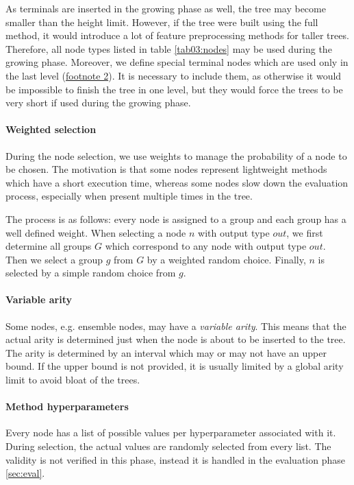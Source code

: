 As terminals are inserted in the growing phase as well, the tree may become
smaller than the height limit. However, if the tree were built using the full
method, it would introduce a lot of feature preprocessing methods for taller
trees. Therefore, all node types listed in table \ref{tab03:nodes} may be used
during the growing phase. Moreover, we define special terminal nodes which are
used only in the last level (\hyperref[tab03:nodes]{footnote 2}). It is
necessary to include them, as otherwise it would be impossible to finish the
tree in one level, but they would force the trees to be very short if used
during the growing phase.

\paragraph{Weighted selection}
During the node selection, we use weights to manage the probability of a node
to be chosen. The motivation is that some nodes represent lightweight methods
which have a short execution time, whereas some nodes slow down the evaluation
process, especially when present multiple times in the tree.

The process is as follows: every node is assigned to a group and each group has
a well defined weight. When selecting a node $n$ with output type $out$, we 
first determine all groups $G$ which correspond to any node with output type
$out$. Then we select a group $g$ from $G$ by a weighted random choice.
Finally, $n$ is selected by a simple random choice from $g$.

\paragraph{Variable arity}
Some nodes, e.g. ensemble nodes, may have a \emph{variable arity}. This means
that the actual arity is determined just when the node is about to be inserted
to the tree. The arity is determined by an interval which may or may not have
an upper bound. If the upper bound is not provided, it is usually limited by
a global arity limit to avoid bloat of the trees.

\paragraph{Method hyperparameters}
Every node has a list of possible values per hyperparameter associated with
it. During selection, the actual values are randomly selected from every list.
The validity is not verified in this phase, instead it is handled in the
evaluation phase \ref{sec:eval}.

